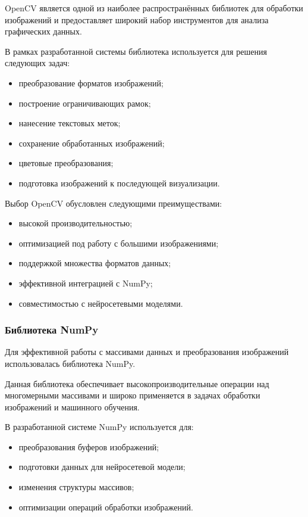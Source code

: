 OpenCV является одной из наиболее распространённых библиотек для обработки изображений и предоставляет широкий набор инструментов для анализа графических данных.

В рамках разработанной системы библиотека используется для решения следующих задач:

\begin{itemize}
	\item преобразование форматов изображений;
	\item построение ограничивающих рамок;
	\item нанесение текстовых меток;
	\item сохранение обработанных изображений;
	\item цветовые преобразования;
	\item подготовка изображений к последующей визуализации.
\end{itemize}

Выбор OpenCV обусловлен следующими преимуществами:

\begin{itemize}
	\item высокой производительностью;
	\item оптимизацией под работу с большими изображениями;
	\item поддержкой множества форматов данных;
	\item эффективной интеграцией с NumPy;
	\item совместимостью с нейросетевыми моделями.
\end{itemize}

\subsubsection{Библиотека NumPy}

Для эффективной работы с массивами данных и преобразования изображений использовалась библиотека NumPy.

Данная библиотека обеспечивает высокопроизводительные операции над многомерными массивами и широко применяется в задачах обработки изображений и машинного обучения.

В разработанной системе NumPy используется для:

\begin{itemize}
	\item преобразования буферов изображений;
	\item подготовки данных для нейросетевой модели;
	\item изменения структуры массивов;
	\item оптимизации операций обработки изображений.
\end{itemize}

